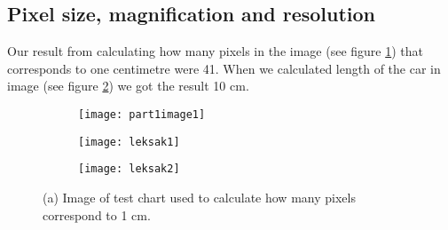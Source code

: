\subsection{Pixel size, magnification and resolution}
Our result from calculating how many pixels in the image (see figure \ref{fig:TestChart}) that corresponds to one centimetre were 41. When we calculated length of the car in image (see figure \ref{fig:Toy1}) we got the result 10 cm. 

\begin{figure}[h]
	\centering
	\begin{subfigure}[b]{0.3\textwidth}
		\texttt{[image: part1image1]}
		\caption{}
		\label{fig:TestChart}
	\end{subfigure}
	\begin{subfigure}[b]{0.3\textwidth}
		\texttt{[image: leksak1]}
		\caption{}
		\label{fig:Toy1}
	\end{subfigure}
	\begin{subfigure}[b]{0.3\textwidth}
		\texttt{[image: leksak2]}
		\caption{}
		\label{fig:Toy2}
	\end{subfigure}
	\caption{(a) Image of test chart used to calculate how many pixels correspond to 1 cm.}
	\label{fig:part1}
\end{figure}
